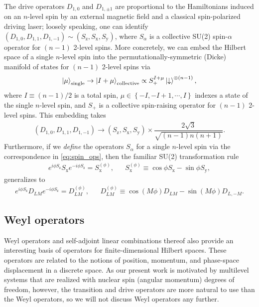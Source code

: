 \documentclass[nofootinbib,notitlepage,11pt]{revtex4-2}
\renewcommand{\t}{\text} %
\newcommand{\f}[2]{\dfrac{#1}{#2}} %
\newcommand{\p}[1]{\left(#1\right)} %
\renewcommand{\set}[1]{\left\{#1\right\}} %
\newcommand{\1}{\mathds{1}}
\newcommand{\dn}{\downarrow}
\newcommand{\x}{\text{x}}
\newcommand{\y}{\text{y}}
\newcommand{\z}{\text{z}}
\begin{document}
The drive operators $D_{1,0}$ and $D_{1,\pm1}$ are proportional to the
Hamiltonians induced on an $n$-level spin by an external magnetic
field and a classical spin-polarized driving laser; loosely speaking,
one can identify $\p{D_{1,0},D_{1,1},D_{1,-1}}\sim\p{S_\z,S_\x,S_\y}$,
where $S_\alpha$ is a collective SU(2) spin-$\alpha$ operator for
$\p{n-1}$ 2-level spins\cite{perlin2019shorttime}.  More concretely,
we can embed the Hilbert space of a single $n$-level spin into the
permutationally-symmetric (Dicke) manifold of states for $\p{n-1}$
2-level spins via
\begin{align}
  \ket{\mu}_{\t{single}} \to \ket{I+\mu}_{\t{collective}}
  \propto S_+^{I+\mu} \ket\dn^{\otimes\p{n-1}},
\end{align}
where $I\equiv\p{n-1}/2$ is a total spin,
$\mu\in\set{-I,-I+1,\cdots,I}$ indexes a state of the single $n$-level
spin, and $S_+$ is a collective spin-raising operator for $\p{n-1}$
2-level spins.  This embedding takes
\begin{align}
  \p{D_{1,0},D_{1,1},D_{1,-1}}
  \to \p{S_\z,S_\x,S_\y}
  \times \f{2\sqrt{3}}{\sqrt{\p{n-1}n\p{n+1}}}.
  \label{eq:spin_ops}
\end{align}
Furthermore, if we {\it define} the operators $S_\alpha$ for a single
$n$-level spin via the correspondence in \eqref{eq:spin_ops}, then the
familiar SU(2) transformation rule
\begin{align}
  e^{i\phi S_\z} S_\x e^{-i\phi S_\z} = S_\x^{(\phi)},
  &&
  S_\x^{(\phi)} \equiv \cos\phi S_\x - \sin\phi S_\y,
\end{align}
generalizes to
\begin{align}
  e^{i\phi S_\z} D_{LM} e^{-i\phi S_\z} = D_{LM}^{(\phi)},
  &&
  D_{LM}^{(\phi)} \equiv \cos\p{M\phi} D_{LM} - \sin\p{M\phi} D_{L,-M}.
\end{align}

\subsection{Weyl operators}

Weyl operators\cite{bertlmann2008bloch} and self-adjoint linear
combinations thereof\cite{asadian2016heisenbergweyl} also provide an
interesting basis of operators for finite-dimensional Hilbert spaces.
These operators are related to the notions of position, momentum, and
phase-space displacement in a discrete space.  As our present work is
motivated by multilevel systems that are realized with nuclear spin
(angular momentum) degrees of freedom, however, the transition and
drive operators are more natural to use than the Weyl operators, so we
will not discuss Weyl operators any further.
\end{document}
